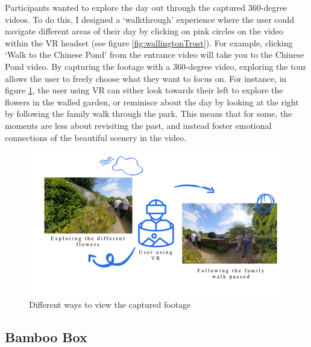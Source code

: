 Participants wanted to explore the day out through the captured 360-degree videos. To do this, I designed a ‘walkthrough’ experience where the user could navigate different areas of their day by clicking on pink circles on the video within the VR headset (see figure \ref{fig:wallingtonTrust}). For example, clicking ‘Walk to the Chinese Pond’ from the entrance video will take you to the Chinese Pond video. By capturing the footage with a 360-degree video, exploring the tour allows the user to freely choose what they want to focus on. For instance, in figure \ref{fig:capturedFootage}, the user using VR can either look towards their left to explore the flowers in the walled garden, or reminisce about the day by looking at the right by following the family walk through the park. This means that for some, the moments are less about revisiting the past, and instead foster emotional connections of the beautiful scenery in the video. 

\begin{figure}[htp]
\centering
\includegraphics[width=.8\linewidth]{Images/ChapterFour/WaysToViewCapturedFootage.png}
\caption{Different ways to view the captured footage}
\label{fig:capturedFootage}
\end{figure}

\subsection{Bamboo Box}
\label{Bamboo box}

